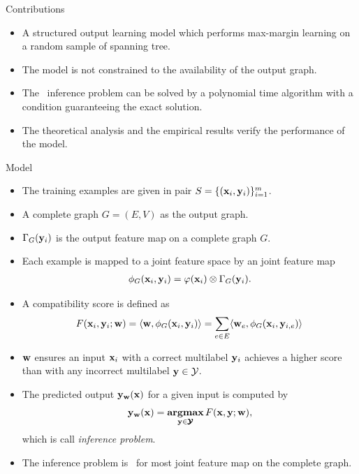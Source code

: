\documentclass[first=dgreen,second=purple,logo=yellowexc]{aaltoslides}
\begin{document}
%
\begin{frame}{Contributions}
	\begin{itemize}
		\item A structured output learning model which performs max-margin learning on a random sample of spanning tree.
		\item The model is not constrained to the availability of the output graph.
		\item The \nphard\ inference problem can be solved by a polynomial time algorithm with a condition guaranteeing the exact solution.
		\item The theoretical analysis and the empirical results verify the performance of the model.
	\end{itemize}
\end{frame}



%
\begin{frame}[allowframebreaks]{Model}
	\begin{itemize}
		\item The training examples are given in pair $S=\{(\mathbf {x}_i,\mathbf {y}_i)\}_{i=1}^{m}$.
		\item A complete graph $G=(E,V)$ as the output graph.
		\item $\Gamma_G(\mathbf {y}_i)$ is the output feature map on a complete graph $G$.
		\item Each example is mapped to a joint feature space by an joint feature map
		\begin{align*}
			\phi_G(\mathbf {x}_i,\mathbf {y}_i) = \varphi(\mathbf {x}_i)\otimes\Gamma_G(\mathbf {y}_i).
		\end{align*}
		\item A compatibility score is defined as
		\begin{align*}
			F(\mathbf {x}_i,\mathbf {y}_i;\mathbf {w}) = \langle \mathbf {w}, \phi_G(\mathbf {x}_i,\mathbf {y}_i) \rangle=\sum_{e\in E}\langle \mathbf {w}_e, \phi_G(\mathbf {x}_i,\mathbf {y}_{i,e}) \rangle
		\end{align*} 
		\item $\mathbf {w}$ ensures an input $\mathbf {x}_i$ with a correct multilabel $\mathbf {y}_i$ achieves a higher score than with any incorrect multilabel $\mathbf {y}\in\mathcal{Y}$.
		\item The predicted output $\mathbf {y}_{\mathbf {w}}(\mathbf {x})$ for a given input is computed by
		\begin{align*}
			\mathbf {y}_{\mathbf {w}}(\mathbf {x}) = \underset{\mathbf {y}\in\pmb {\mathcal{Y}}}{\textbf{argmax}}\,F(\mathbf {x},\mathbf {y};\mathbf {w}),
		\end{align*}
		which is call \textit{inference problem}.
		\item The {inference problem} is \nphard\ for most joint feature map on the complete graph.
	\end{itemize}
\end{frame}
\end{document}
